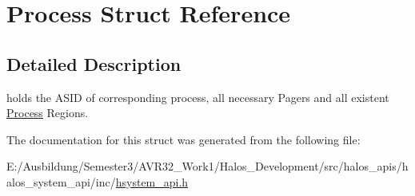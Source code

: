 \hypertarget{struct_process}{
\section{Process Struct Reference}
\label{struct_process}
}


\subsection{Detailed Description}
holds the ASID of corresponding process, all necessary Pagers and all existent \hyperlink{struct_process}{Process} Regions. 

The documentation for this struct was generated from the following file:\begin{CompactItemize}
\item 
E:/Ausbildung/Semester3/AVR32\_\-Work1/Halos\_\-Development/src/halos\_\-apis/halos\_\-system\_\-api/inc/\hyperlink{hsystem__api_8h}{hsystem\_\-api.h}\end{CompactItemize}
